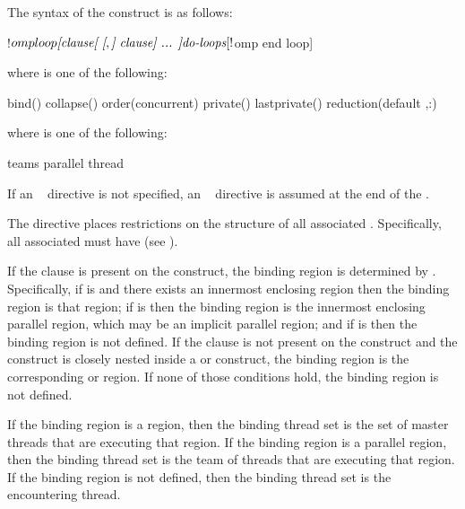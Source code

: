 \begin{fortranspecific}
The syntax of the  construct is as follows:

\begin{ompfPragma}
!$omp loop \plc{[clause[ [},\plc{] clause] ... ]}
   \plc{do-loops}
[!$omp end loop]
\end{ompfPragma}

\begin{samepage}
where  is one of the following:

\begin{indentedcodelist}
bind()
collapse()
order(concurrent)
private()
lastprivate()
reduction(\plc{[}default ,\plc{]reduction-identifier }:)
\end{indentedcodelist}
\end{samepage}

where  is one of the following:
\begin{indentedcodelist}
  teams
  parallel
  thread
\end{indentedcodelist}

If an ~ directive is not specified, an
 ~ directive is assumed at the end of the
.

The  directive places restrictions on the structure of all
associated . Specifically, all associated  must
have  (see ).
\end{fortranspecific}

\binding
If the  clause is present on the construct, the binding region is
determined by . Specifically, if  is 
and there exists an innermost enclosing  region then the binding
region is that  region; if  is  then
the binding region is the innermost enclosing parallel region, which may be an
implicit parallel region; and if  is  then the
binding region is not defined. If the  clause is not present on the
construct and the  construct is closely nested inside a
 or  construct, the binding region is the
corresponding  or  region. If none of those
conditions hold, the binding region is not defined.

If the binding region is a  region, then the binding thread set is
the set of master threads that are executing that region. If the binding region
is a parallel region, then the binding thread set is the team of threads that
are executing that region. If the binding region is not defined, then the binding
thread set is the encountering thread.

